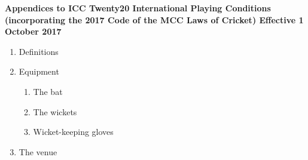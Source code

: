 \documentclass[12pt]{article}
\begin{document}
\vspace{\baselineskip}
\begin{adjustwidth}{2.42in}{0.0in}
\begin{Center}
{\fontsize{9pt}{10.8pt}\selectfont \textbf{Appendices to ICC Twenty20 International Playing Conditions (incorporating the 2017 Code of the MCC Laws of Cricket) Effective 1 October 2017}\par}
\end{Center}\par

\end{adjustwidth}


\vspace{\baselineskip}
\begin{enumerate}
	\item {\fontsize{9pt}{10.8pt}\selectfont Definitions\par}\par


\vspace{\baselineskip}
	\item {\fontsize{9pt}{10.8pt}\selectfont Equipment\par}\par


\vspace{\baselineskip}
\begin{enumerate}
	\item {\fontsize{9pt}{10.8pt}\selectfont The bat\par}\par


\vspace{\baselineskip}
	\item {\fontsize{9pt}{10.8pt}\selectfont The wickets\par}\par


\vspace{\baselineskip}
	\item {\fontsize{9pt}{10.8pt}\selectfont Wicket-keeping gloves\par}\par


\vspace{\baselineskip}

\end{enumerate}
	\item {\fontsize{9pt}{10.8pt}\selectfont The venue\par}\par



\end{enumerate}
\end{document}
